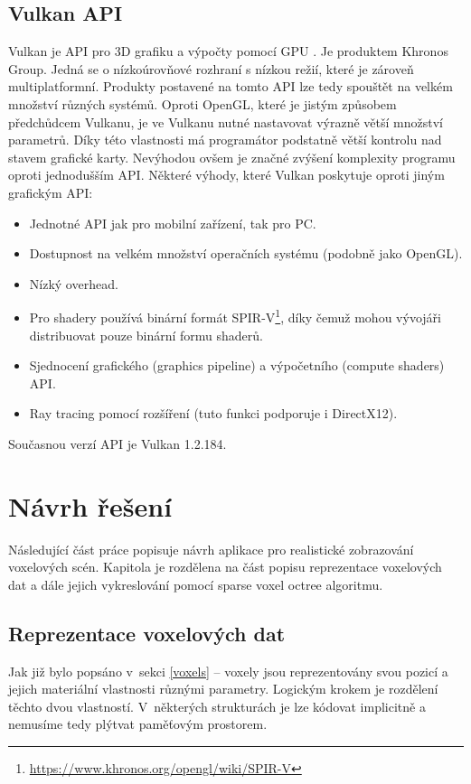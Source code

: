 \section{Vulkan API}
Vulkan je API pro 3D grafiku a výpočty pomocí GPU \cite{vulkan_web}. Je produktem Khronos Group. Jedná se o nízkoúrovňové rozhraní s nízkou režií, které je zároveň multiplatformní. Produkty postavené na tomto API lze tedy spouštět na velkém množství různých systémů. Oproti OpenGL, které je jistým způsobem předchůdcem Vulkanu, je ve Vulkanu nutné nastavovat výrazně větší množství parametrů. Díky této vlastnosti má programátor podstatně větší kontrolu nad stavem grafické karty. Nevýhodou ovšem je značné zvýšení komplexity programu oproti jednodušším API. Některé výhody, které Vulkan poskytuje oproti jiným grafickým API:

\begin{itemize}
	\item Jednotné API jak pro mobilní zařízení, tak pro PC.
	\item Dostupnost na velkém množství operačních systému (podobně jako OpenGL).
	\item Nízký overhead.
	\item Pro shadery používá binární formát SPIR-V\footnote{\url{https://www.khronos.org/opengl/wiki/SPIR-V}}, díky čemuž mohou vývojáři distribuovat pouze binární formu shaderů.
	\item Sjednocení grafického (graphics pipeline) a výpočetního (compute shaders) API.
	\item Ray tracing pomocí rozšíření (tuto funkci podporuje i DirectX12).
\end{itemize}

Současnou verzí API je Vulkan 1.2.184\cite{vulkanspec}.

\chapter{Návrh řešení}
\label{navrh}
Následující část práce popisuje návrh aplikace pro realistické zobrazování voxelových scén. Kapitola je rozdělena na část popisu reprezentace voxelových dat a dále jejich vykreslování pomocí sparse voxel octree algoritmu.

\section{Reprezentace voxelových dat}\label{sec:voxel_representation}
Jak již bylo popsáno v~sekci \ref{voxels} -- voxely jsou reprezentovány svou pozicí a jejich materiální vlastnosti různými parametry. Logickým krokem je rozdělení těchto dvou vlastností. V~některých strukturách je lze kódovat implicitně a nemusíme tedy plýtvat paměťovým prostorem.

